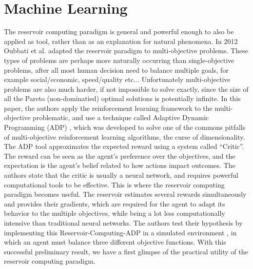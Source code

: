 \documentclass[12pt,oneside]{CUNY_CS_PhD}
\begin{document}
\section{Machine Learning}
The reservoir computing paradigm is general and powerful enough to also be applied as tool, rather than as an explanation for natural phenomena. In 2012 Oubbati et al. \cite{oubbati_multiobjective_2012} adapted the reservoir paradigm to multi-objective problems. These types of problems are perhaps more naturally occurring than single-objective problems, after all most human decision need to balance multiple goals, for example social/economic, speed/quality etc... Unfortunately multi-objective problems are also much harder, if not impossible to solve exactly, since the size of all the Pareto (non-dominatied) optimal solutions is potentially infinite. In this paper, the authors apply the reinforcement learning framework to the multi-objective problematic, and use a technique called Adaptive Dynamic Programming (ADP) \cite{wang2009adaptive}, which was developed to solve one of the commons pitfalls of multi-objective reinforcement learning algorithms, the curse of dimensionality. The ADP tool approximates the expected reward using a system called “Critic”. The reward can be seen as the agent's preference over the objectives, and the expectation is the agent's belief related to how actions impact outcomes. The authors state that the critic is usually a neural network, and requires powerful computational tools to be effective. This is where the reservoir computing paradigm becomes useful. The reservoir estimates several rewards simultaneously and provides their gradients, which are required for the agent to adapt its behavior to the multiple objectives, while being a lot less computationally intensive than traditional neural networks. The authors test their hypothesis by implementing this Reservoir-Computing-ADP in a simulated environment , in which an agent must balance three different objective functions. With this successful preliminary result, we have a first glimpse of the practical utility of the reservoir computing paradigm.
\end{document}
